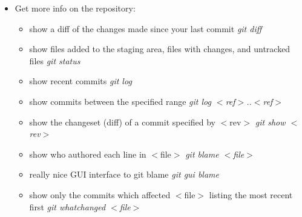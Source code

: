 \begin{itemize}
\begin{itemize}
   \end{itemize}

\item Get more info on the repository:
   \begin{itemize}
          \item show a diff of the changes made since your last commit \textit{git diff}
	  \item show files added to the staging area, files with changes, and untracked files \textit{git status}
	  \item show recent commits \textit{git log}
	  \item show commits between the specified range \textit{git log $<$ref$>$..$<$ref$>$}
	  \item show the changeset (diff) of a commit specified by $<$rev$>$ \textit{git show $<$rev$>$}
	  \item show who authored each line in $<$file$>$ \textit{ git blame $<$file$>$ }
	  \item really nice GUI interface to git blame \textit{ git gui blame}
	  \item show only the commits which affected $<$file$>$ listing the most recent first \textit{git whatchanged $<$file$>$}
   \end{itemize}     


\end{itemize}
